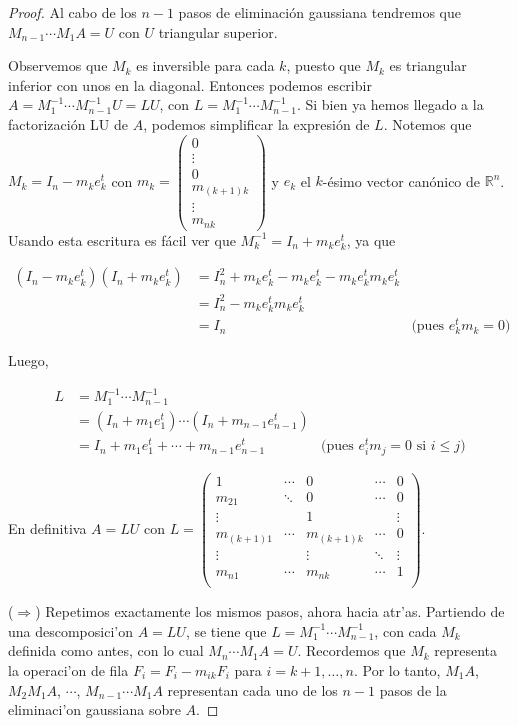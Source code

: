\begin{propo}
\begin{proof}
Al cabo de los $n - 1$ pasos de eliminación gaussiana tendremos que $M_{n - 1} \cdots M_1 A = U$ con $U$ triangular superior. 

Observemos que $M_k$ es inversible para cada $k$, puesto que $M_k$ es triangular inferior con unos en la diagonal. Entonces podemos escribir $A = M_1^{-1}\cdots M_{n - 1}^{-1} U = LU$, con $L = M_1^{-1}\cdots M_{n - 1}^{-1}$. Si bien ya hemos llegado a la factorización LU de $A$, podemos simplificar la expresión de $L$. Notemos que $M_k = I_n - m_k e_k^t$ con $m_k = \begin{pmatrix}0\\ \vdots \\ 0 \\ m_{(k+1)k} \\ \vdots \\ m_{nk}\end{pmatrix}$ y $e_k$ el $k$-ésimo vector canónico de $\mathbb{R}^n$. Usando esta escritura es fácil ver que $M_k^{-1} = I_n + m_k e_k^t$, ya que

\begin{align*}
(I_n - m_k e_k^t)(I_n + m_k e_k^t) & = I_n^2 + m_k e_k^t - m_k e_k^t - m_k e_k^t m_k e_k^t &\\
& = I_n^2 - m_k e_k^t m_k e_k^t &\\
& = I_n & \text{(pues } e_k^t m_k = 0\text{)}
\end{align*}

Luego,

\begin{align*}
L & = M_1^{-1} \cdots M_{n - 1}^{-1} &\\
	& = (I_n + m_1 e_1^t) \cdots (I_n + m_{n - 1} e_{n - 1}^t) &\\
	& = I_n + m_1 e_1^t + \cdots + m_{n - 1} e_{n - 1}^t & \text{(pues } e_i^t m_j = 0 \text{ si } i \leq j \text{)}
\end{align*}

En definitiva $A = LU$ con $L = \begin{pmatrix} 
1 			& \cdots 	& 0 				& \cdots 	& 0 \\
m_{21} 		& \ddots 	& 0 				& \cdots 	& 0 \\
\vdots 		& 			& 1 				& 			& \vdots\\
m_{(k+1)1}	& \cdots		& m_{(k+1)k} 	& \cdots		& 0\\
\vdots		& 			& \vdots		 	& \ddots		& \vdots\\
m_{n1}		& \cdots		& m_{nk}		& \cdots		& 1\\
\end{pmatrix}$.

($\Rightarrow$) Repetimos exactamente los mismos pasos, ahora hacia atr'as. Partiendo de una descomposici'on $A = LU$, se tiene que $L = M_1^{-1}\cdots M_{n - 1}^{-1}$, con cada $M_k$ definida como antes, con lo cual $M_n \cdots M_1 A = U$. Recordemos que $M_k$ representa la operaci'on de fila $F_i = F_i - m_{ik}F_i$ para $i = k + 1, \dots, n$. Por lo tanto, $M_1A$, $M_2 M_1 A$, $\cdots$, $M_{n - 1} \cdots M_1 A$ representan cada uno de los $n - 1$ pasos de la eliminaci'on gaussiana sobre $A$.

	\end{proof}
\end{propo}
